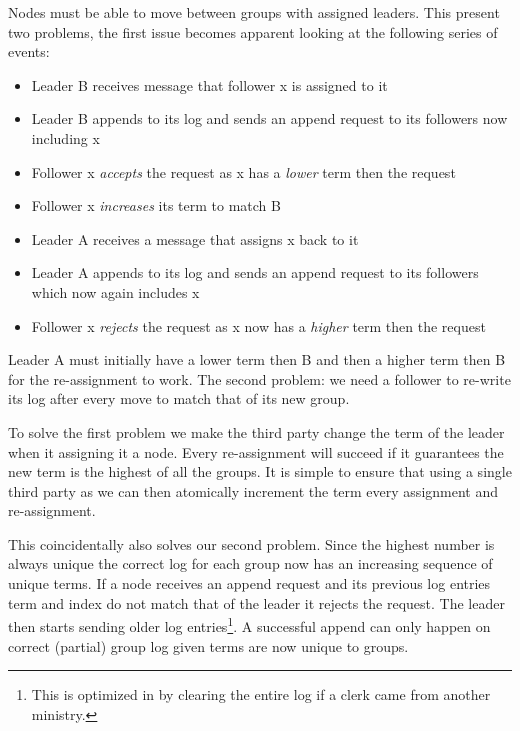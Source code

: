 Nodes must be able to move between groups with assigned leaders. This present two problems, the first issue becomes apparent looking at the following series of events:
\begin{itemize}
	\item Leader B receives message that follower x is assigned to it
	\item Leader B appends to its log and sends an append request to its followers now including x
	\item Follower x \emph{accepts} the request as x has a \emph{lower} term then the request
	\item Follower x \emph{increases} its term to match B
	\item Leader A receives a message that assigns x back to it
	\item Leader A appends to its log and sends an append request to its followers which now again includes x
	\item Follower x \emph{rejects} the request as x now has a \emph{higher} term then the request
\end{itemize}
Leader A must initially have a lower term then B and then a higher term then B for the re-assignment to work. The second problem: we need a follower to re-write its log after every move to match that of its new group. 

To solve the first problem we make the third party change the term of the leader when it assigning it a node. Every re-assignment will succeed if it guarantees the new term is the highest of all the groups. It is simple to ensure that using a single third party as we can then atomically increment the term every assignment and re-assignment. 

This coincidentally also solves our second problem. Since the highest number is always unique the correct log for each group now has an increasing sequence of unique terms. If a node receives an append request and its previous log entries term and index do not match that of the leader it rejects the request. The leader then starts sending older log entries\footnote{This is optimized in \name{} by clearing the entire log if a clerk came from another ministry.}. A successful append can only happen on correct (partial) group log given terms are now unique to groups.
